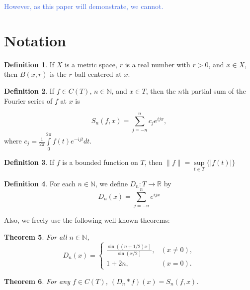 \documentclass{amsart}
\newcommand{\N}{\mathbb{N}}
\newcommand{\R}{\mathbb{R}}
\newcommand{\colorcomment}[2]{\textcolor{#1}{#2}} %
\newcommand{\absval}[1]{\lvert #1 \rvert}
\newcommand{\norm}[1]{\|#1\|}
\newtheorem{thm}{Theorem}[section]
\theoremstyle{definition}
\newtheorem{definition}[thm]{Definition}
\begin{document}
\colorcomment{RoyalBlue}{However, as this paper will demonstrate, we cannot.}

\section{Notation}

\begin{definition}
If $X$ is a metric space, $r$ is a real number with $r>0$, and $x \in X$, then $B(x,r)$ is the $r$-ball centered at $x$.
\end{definition}


\begin{definition}
If $f \in C(T)$, $n \in \N$, and $x \in T$, then the $n$th partial sum of the Fourier series of $f$ at $x$ is 

\begin{displaymath}
S_n(f,x) = \sum\limits_{j=-n}^n c_j e^{ijx},
\end{displaymath}
where $c_j = \frac{1}{2 \pi} \int\limits_0^{2\pi} f(t)e^{-ijt} dt$.
\end{definition}

\begin{definition}
If $f$ is a bounded function on $T$, then $\norm{f} = \sup\limits_{t \in T} \{\absval{f(t)}\}$
\end{definition}

\begin{definition}
For each $n \in \N$, we define $D_n: T \to \R$ by
\begin{displaymath}
   D_n(x) = \sum\limits_{j=-n}^n e^{ijx}
\end{displaymath} 
\end{definition}

Also, we freely use the following well-known theorems:

\begin{thm}
For all $n \in \N$, 
\begin{displaymath}
   D_n(x) = \left\{
     \begin{array}{lr}
       \frac{\sin((n+1/2)x)}{\sin(x/2)}, &(x \neq 0),\\
       1+2n, &(x=0).
     \end{array}
   \right.
\end{displaymath}
\end{thm}

\begin{thm}
For any $f \in C(T)$, $(D_n \ast f)(x) = S_n(f,x)$. 
\end{thm}
\end{document}
